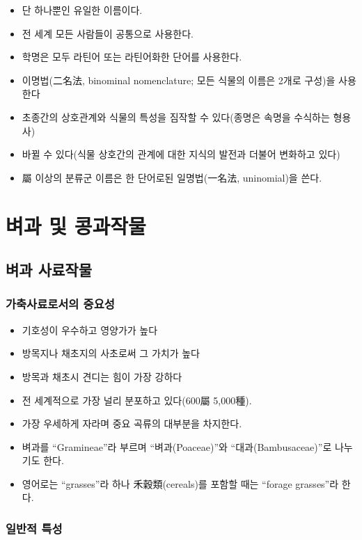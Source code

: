 \documentclass[]{book}
\providecommand{\tightlist}{%
  \setlength{\itemsep}{0pt}\setlength{\parskip}{0pt}}
\begin{document}
\begin{itemize}
\tightlist
\item
  단 하나뿐인 유일한 이름이다.
\item
  전 세계 모든 사람들이 공통으로 사용한다.
\item
  학명은 모두 라틴어 또는 라틴어화한 단어를 사용한다.
\item
  이명법(二名法, binominal nomenclature; 모든 식물의 이름은 2개로
  구성)을 사용한다
\item
  초종간의 상호관계와 식물의 특성을 짐작할 수 있다(종명은 속명을
  수식하는 형용사)
\item
  바뀔 수 있다(식물 상호간의 관계에 대한 지식의 발전과 더불어 변화하고
  있다)
\item
  屬 이상의 분류군 이름은 한 단어로된 일명법(一名法, uninomial)을 쓴다.
\end{itemize}

\chapter{벼과 및 콩과작물}\label{legumeandgrass}

\section{벼과 사료작물}\label{-}

\subsection{가축사료로서의 중요성}\label{-}

\begin{itemize}
\tightlist
\item
  기호성이 우수하고 영양가가 높다
\item
  방목지나 채초지의 사초로써 그 가치가 높다
\item
  방목과 채초시 견디는 힘이 가장 강하다
\item
  전 세계적으로 가장 널리 분포하고 있다(600屬 5,000種).
\item
  가장 우세하게 자라며 중요 곡류의 대부분을 차지한다.
\item
  벼과를 ``Gramineae''라 부르며 ``벼과(Poaceae)''와
  ``대과(Bambusaceae)''로 나누기도 한다.
\item
  영어로는 ``grasses''라 하나 禾穀類(cereals)를 포함할 때는 ``forage
  grasses''라 한다.
\end{itemize}

\subsection{일반적 특성}\label{-}
\end{document}
